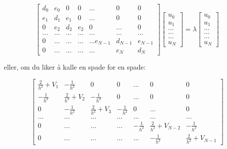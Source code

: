 \documentclass{article}
\begin{document}
\begin{equation}
    \begin{bmatrix}d_0 & e_0 & 0   & 0    & \dots  &0     & 0 \\
                                e_1 & d_1 & e_1 & 0    & \dots  &0     &0 \\
                                0   & e_2 & d_2 & e_2  &0       &\dots & 0\\
                                \dots  & \dots & \dots & \dots  &\dots      &\dots & \dots\\
                                0   & \dots & \dots & \dots  &\dots  e_{N-1}     &d_{N-1} & e_{N-1}\\
                                0   & \dots & \dots & \dots  &\dots       &e_{N} & d_{N}
             \end{bmatrix}  \begin{bmatrix} u_{0} \\
                                                              u_{1} \\
                                                              \dots\\ \dots\\ \dots\\
                                                              u_{N}
             \end{bmatrix}=\lambda \begin{bmatrix} u_{0} \\
                                                              u_{1} \\
                                                              \dots\\ \dots\\ \dots\\
                                                              u_{N}
             \end{bmatrix}
\end{equation} 

eller, om du liker å kalle en spade for en spade:

\begin{equation}
    \begin{bmatrix} \frac{2}{h^2}+V_1 & -\frac{1}{h^2} & 0   & 0    & \dots  &0     & 0 \\
                                -\frac{1}{h^2} & \frac{2}{h^2}+V_2 & -\frac{1}{h^2} & 0    & \dots  &0     &0 \\
                                0   & -\frac{1}{h^2} & \frac{2}{h^2}+V_3 & -\frac{1}{h^2}  &0       &\dots & 0\\
                                \dots  & \dots & \dots & \dots  &\dots      &\dots & \dots\\
                                0   & \dots & \dots & \dots  &-\frac{1}{h^2}  &\frac{2}{h^2}+V_{N-2} & -\frac{1}{h^2}\\
                                0   & \dots & \dots & \dots  &\dots       &-\frac{1}{h^2} & \frac{2}{h^2}+V_{N-1}
             \end{bmatrix}
\label{eq:matrixse} 
\end{equation}
\end{document}
